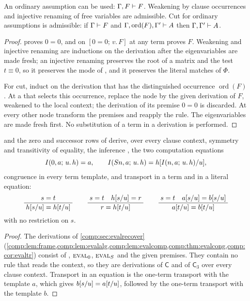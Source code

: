 \begin{lemma}
\label{claus:lem:struct}
An ordinary assumption can be used: $\Gamma,F\vdash F$. Weakening by clause
occurrences and injective renaming of free variables are admissible. Cut for
ordinary assumptions is admissible: if $\Gamma\vdash F$ and
$\Gamma,\operatorname{ord}(F),\Gamma'\vdash A$ then
$\Gamma,\Gamma'\vdash A$.
\end{lemma}
\begin{proof}
 proves $0=0$, and  on $[0=0;\,v.\,F]$ at any
term proves $F$. Weakening and injective renaming are inductions on the
derivation after the eigenvariables are made fresh; an injective renaming
preserves the root of a matrix and the test $t\equiv 0$, so it preserves the
mode of , and it preserves the literal matches of $\Phi$.

For cut, induct on the derivation that has the distinguished occurrence
$\operatorname{ord}(F)$. At a  that selects this occurrence,
replace the node by the given derivation of $F$, weakened to the local
context; the derivation of its premise $0=0$ is discarded. At every other
node transform the premises and reapply the rule. The eigenvariables are
made fresh first. No substitution of a term in a derivation is performed.
\end{proof}

\begin{lemma}
\label{claus:lem:eq}
 and the zero and successor rows of  derive,
over every clause context, symmetry and transitivity of equality, the
inference , the two computation equations
\[
 I(0,a;\,u.\,h)=a,\qquad
 I(S n,a;\,u.\,h)=h[I(n,a;\,u.\,h)/u],
\]
congruence in every term template, and transport in a term and in a
literal equation:
\[
 \dfrac{\;s=t\;}{\;h[s/u]=h[t/u]\;}
 \qquad
 \dfrac{\;s=t\quad h[s/u]=r\;}{\;r=h[t/u]\;}
 \qquad
 \dfrac{\;s=t\quad a[s/u]=b[s/u]\;}{\;a[t/u]=b[t/u]\;}
\]
with no restriction on $s$.
\end{lemma}
\begin{proof}
The derivations of \cref{comp:sec:evalrecover}
(\cref{comp:lem:frame,comp:lem:evalalg,comp:lem:evalcomp,comp:thm:evalcong,comp:cor:evaltr})
consist of , $\rulename{Eval}_0$, $\rulename{Eval}_{\Suc}$
and the given premises. They contain no rule that reads the context, so
they are derivations of $\mathsf{C}$ and of $\mathsf{C}_3$ over every
clause context. Transport in an equation is the one-term transport with the
template $a$, which gives $b[s/u]=a[t/u]$, followed by the
one-term transport with the template $b$.
\end{proof}

